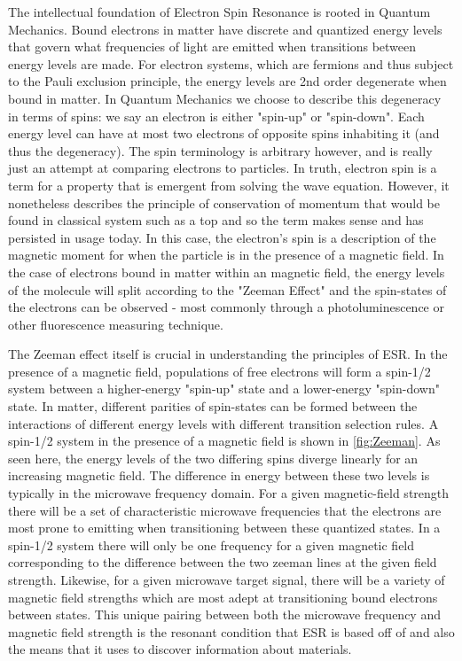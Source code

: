 \documentclass[oneside, astronomy, noacknowlegments]{BYUPhys}
\begin{document}
The intellectual foundation of Electron Spin Resonance is rooted in Quantum Mechanics. Bound electrons in matter have discrete and quantized energy levels that govern what frequencies of light are emitted when transitions between energy levels are made. For electron systems, which are fermions and thus subject to the Pauli exclusion principle, the energy levels are 2nd order degenerate when bound in matter. In Quantum Mechanics we choose to describe this degeneracy in terms of spins: we say an electron is either "spin-up" or "spin-down". Each energy level can have at most two electrons of opposite spins inhabiting it (and thus the degeneracy). The spin terminology is arbitrary however, and is really just an attempt at comparing electrons to particles. In truth, electron spin is a term for a property that is emergent from solving the wave equation. However, it nonetheless describes the principle of conservation of momentum that would be found in classical system such as a top and so the term makes sense and has persisted in usage today. In this case, the electron’s spin is a description of the magnetic moment for when the particle is in the presence of a magnetic field. In the case of electrons bound in matter within an magnetic field, the energy levels of the molecule will split according to the "Zeeman Effect" and the spin-states of the electrons can be observed - most commonly through a photoluminescence or other fluorescence measuring technique.

The Zeeman effect itself is crucial in understanding the principles of ESR. In the presence of a magnetic field, populations of free electrons will form a spin-1/2 system between a higher-energy "spin-up" state and a lower-energy "spin-down" state. In matter, different parities of spin-states can be formed between the interactions of different energy levels with different transition selection rules. A spin-1/2 system in the presence of a magnetic field is shown in \ref{fig:Zeeman}. As seen here, the energy levels of the two differing spins diverge linearly for an increasing magnetic field. The difference in energy between these two levels is typically in the microwave frequency domain. For a given magnetic-field strength there will be a set of characteristic microwave frequencies that the electrons are most prone to emitting when transitioning between these quantized states. In a spin-1/2 system there will only be one frequency for a given magnetic field corresponding to the difference between the two zeeman lines at the given field strength. Likewise, for a given microwave target signal, there will be a variety of magnetic field strengths which are most adept at transitioning bound electrons between states. This unique pairing between both the microwave frequency and magnetic field strength is the resonant condition that ESR is based off of and also the means that it uses to discover information about materials.
\end{document}
